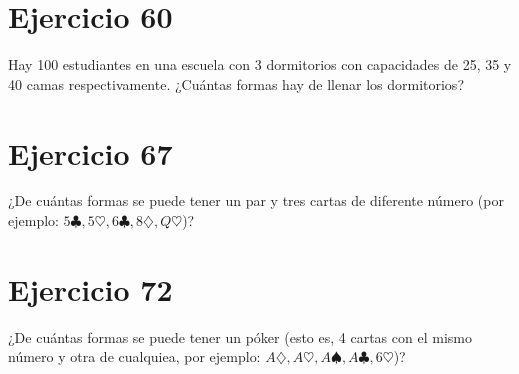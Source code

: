 \documentclass[12pt,a4paper]{article}
\begin{document}
\section*{Ejercicio 60}
Hay 100 estudiantes en una escuela con 3 dormitorios con capacidades de 25, 35 y 40 camas respectivamente. ¿Cuántas formas hay de llenar los dormitorios?

\section*{Ejercicio 67}
¿De cuántas formas se puede tener un par y tres cartas de diferente número (por ejemplo: $5\clubsuit, 5\heartsuit, 6\clubsuit, 8\diamondsuit, Q\heartsuit$)?

\section*{Ejercicio 72}
¿De cuántas formas se puede tener un póker (esto es, 4 cartas con el mismo número y otra de cualquiea, por ejemplo: $A\diamondsuit, A\heartsuit, A\spadesuit, A\clubsuit, 6\heartsuit$)?
\end{document}
